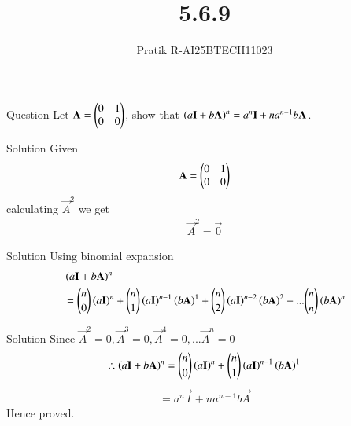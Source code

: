 \documentclass{beamer}
\title 
{5.6.9}
\author 
{Pratik R-AI25BTECH11023}
\begin{document}
\frame{\titlepage}
\begin{frame}{Question}
Let $\mathbf{A}= \begin{pmatrix}0&1\\0&0\end{pmatrix}$, show that $\left(a\mathbf{I} + b\mathbf{A}\right)^n = a^n\mathbf{I} + na^{n-1}b\mathbf{A}$.
\end{frame}
\begin{frame}{Solution}
Given
\begin{align}
  \mathbf{A}= \begin{pmatrix}0&1\\0&0\end{pmatrix}
\end{align}
calculating $\vec{A}^2$ we get 
\begin{align}
   \vec{A}^2 = \vec{0}
\end{align}
\end{frame}
\begin{frame}{Solution}
Using binomial expansion
\begin{align}
&\left(a\mathbf{I} + b\mathbf{A}\right)^n\\
&={n\choose 0}\left(a\mathbf{I}\right)^n + {n\choose 1}\left(a\mathbf{I}\right)^{n-1}\left(b\mathbf{A}\right)^{1} + {n\choose 2}\left(a\mathbf{I}\right)^{n-2}\left(b\mathbf{A}\right)^{2} +... {n\choose n}\left(b\mathbf{A}\right)^{n}
\end{align}
\end{frame}
\begin{frame}{Solution}
Since $\vec{A}^2 =0, \vec{A}^3 =0, \vec{A}^4=0,...\vec{A}^n =0$
\begin{align}
   \therefore \left(a\mathbf{I} + b\mathbf{A}\right)^n = {n\choose 0}\left(a\mathbf{I}\right)^n + {n\choose 1}\left(a\mathbf{I}\right)^{n-1}\left(b\mathbf{A}\right)^{1}
\end{align}
\begin{align}
   = a^n\vec{I} + na^{n-1}b\vec{A}
\end{align}
Hence proved.
\end{frame}
\end{document}

